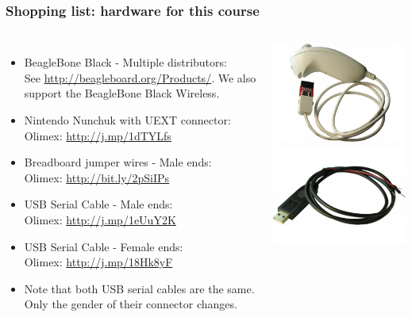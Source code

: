 \begin{frame}
\frametitle{Shopping list: hardware for this course}
  \begin{columns}
    \footnotesize
    \begin{itemize}
      \item BeagleBone Black - Multiple distributors: \\
	    See \url{http://beagleboard.org/Products/}.
	    We also support the BeagleBone Black Wireless.
      \item Nintendo Nunchuk with UEXT connector: \\
            Olimex: \url{http://j.mp/1dTYLfs}
      \item Breadboard jumper wires - Male ends: \\
	    Olimex: \url{http://bit.ly/2pSiIPs}
      \item USB Serial Cable - Male ends: \\
	    Olimex: \url{http://j.mp/1eUuY2K}
      \item USB Serial Cable - Female ends: \\
	    Olimex: \url{http://j.mp/18Hk8yF}
      \item Note that both USB serial cables are the same.\\
            Only the gender of their connector changes.
    \end{itemize}
    \includegraphics[height=0.25\textheight]{slides/kernel-shopping-list/nunchuk.jpg} \\
    \includegraphics[height=0.20\textheight]{slides/kernel-shopping-list/usb-serial-cable-male.jpg} \\

\end{columns}
\end{frame}
